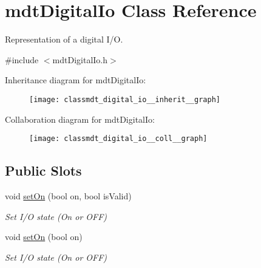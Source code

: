 \hypertarget{classmdt_digital_io}{
\section{mdtDigitalIo Class Reference}
\label{classmdt_digital_io}
}


Representation of a digital I/O.  




{\ttfamily \#include $<$mdtDigitalIo.h$>$}



Inheritance diagram for mdtDigitalIo:\nopagebreak
\begin{figure}[H]
\begin{center}
\leavevmode
\texttt{[image: classmdt\_digital\_io\_\_inherit\_\_graph]}
\end{center}
\end{figure}


Collaboration diagram for mdtDigitalIo:\nopagebreak
\begin{figure}[H]
\begin{center}
\leavevmode
\texttt{[image: classmdt\_digital\_io\_\_coll\_\_graph]}
\end{center}
\end{figure}
\subsection*{Public Slots}
\begin{DoxyCompactItemize}
\item 
void \hyperlink{classmdt_digital_io_ae43db36b2d9f2c3d38cdd97e2ea84bda}{setOn} (bool on, bool isValid)
\begin{DoxyCompactList}\small\item\em Set I/O state (On or OFF) \end{DoxyCompactList}\item 
void \hyperlink{classmdt_digital_io_a88308968532c1e23f695c43a62a3be40}{setOn} (bool on)
\begin{DoxyCompactList}\small\item\em Set I/O state (On or OFF) \end{DoxyCompactList}\end{DoxyCompactItemize}
